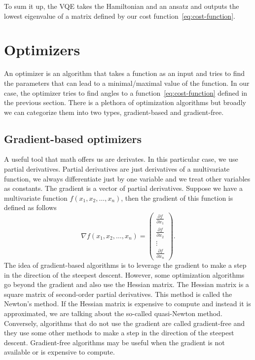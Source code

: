 To sum it up, the VQE takes the Hamiltonian and an ansatz and outputs the lowest eigenvalue of a matrix defined by our cost function~\ref{eq:cost-function}.

\section{Optimizers}
An optimizer is an algorithm that takes a function as an input and tries to find the parameters that can lead to a minimal/maximal value of the function. In our case, the optimizer tries to find angles to a function~\ref{eq:cost-function} defined in the previous section. There is a plethora of optimization algorithms but broadly we can categorize them into two types, gradient-based and gradient-free.

\subsection{Gradient-based optimizers}
A useful tool that math offers us are derivates. In this particular case, we use partial derivatives. Partial derivatives are just derivatives of a multivariate  function, we always differentiate just by one variable and we treat other variables as constants. The gradient is a vector of partial derivatives. Suppose we have a multivariate function $f(x_1, x_2, \ldots, x_n)$, then the gradient of this function is defined as follows
$$\nabla f(x_1, x_2, \ldots, x_n) =  \begin{pmatrix} \frac{\partial f}{\partial x_1} \\ \frac{\partial f}{\partial x_2} \\ \vdots \\ \frac{\partial f}{\partial x_n}\end{pmatrix} \text{.}$$
The idea of gradient-based algorithms is to leverage the gradient to make a step in the direction of the steepest descent. However, some optimization algorithms go beyond the gradient and also use the Hessian matrix. The Hessian matrix is a square matrix of second-order partial derivatives. This method is called the Newton's method. If the Hessian matrix is expensive to compute and instead it is approximated, we are talking about the so-called quasi-Newton method. Conversely, algorithms that do not use the gradient are called gradient-free and they use some other methods to make a step in the direction of the steepest descent. Gradient-free algorithms may be useful when the gradient is not available or is expensive to compute.


